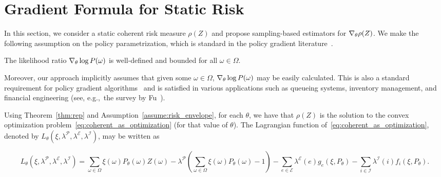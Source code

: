 \documentclass{article} %
\newcommand{\citealt}{\cite}
\newcommand{\citep}{\cite}
\begin{document}

\vspace{-0.1in}
\section{Gradient Formula for Static Risk}\label{sec:static}
\vspace{-0.1in}

In this section, we consider a static coherent risk measure $\rho(Z)$ and propose sampling-based estimators for $\nabla_{\theta} \rho(Z)$. We make the following assumption on the policy parametrization, which is standard in the policy gradient literature~\citep{MarTsi98}.
%
\begin{assumption}\label{ass:LR_well_behaved}
The likelihood ratio $\nabla_{\theta} \log P(\omega)$ is well-defined and bounded for all $\omega \!\in \!\Omega$.
\end{assumption}
%
Moreover, our approach implicitly assumes that given some $\omega\in\Omega$, $\nabla_{\theta} \log P(\omega)$ may be easily calculated. This is also a standard requirement for policy gradient algorithms~\cite{MarTsi98} and is satisfied in various applications such as queueing systems, inventory management, and financial engineering (see, e.g.,~the survey by Fu~\citealt{Fu2006gradients}).

Using Theorem~\ref{thm:rep} and Assumption~\ref{assume:risk_envelope}, for each $\theta$, we have that $\rho(Z)$ is the solution to the convex optimization problem~\eqref{eq:coherent_as_optimization} (for that value of $\theta$). The Lagrangian function of~\eqref{eq:coherent_as_optimization}, denoted by $L_{\theta}(\xi,\lambda^{\mathcal P},\lambda^{\mathcal E},\lambda^{\mathcal I})$, may be written as

\vspace{-0.2in}
\begin{small}
\begin{equation}\label{eq:Lagrangian}
L_{\theta}(\xi,\lambda^{\mathcal P}\!\!,\lambda^{\mathcal E}\!\!,\lambda^{\mathcal I})
\!=\!\!\sum_{\omega \in \Omega} \!\xi(\omega) P_\theta(\omega) Z(\omega)-\lambda^{\mathcal P}\!\left(\sum_{\omega \in \Omega}\xi(\omega)P_\theta(\omega)\!-\!1\!\right)
-\sum_{e\in\mathcal E}\lambda^{\mathcal E}(e) g_e(\xi,\!P_\theta)-\sum_{i\in\mathcal I}\lambda^{\mathcal I}(i) f_i(\xi,\!P_\theta).
\end{equation}
\end{small}
\vspace{-0.2in}
\end{document}

